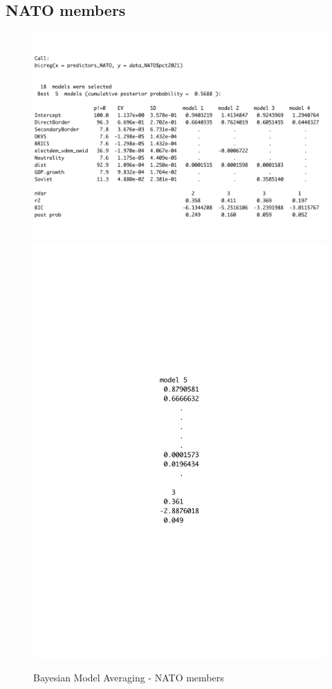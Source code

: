 \documentclass[12pt,a4paper]{article}
\begin{document}
\subsection{NATO members}
\begin{figure}[h]
\center
\label{F:2}
\includegraphics[scale=0.4]{BMA_NATO}
\includegraphics[scale=0.4]{BMA_NATO_2}
\caption{Bayesian Model Averaging - NATO members}
\end{figure}
\end{document}

